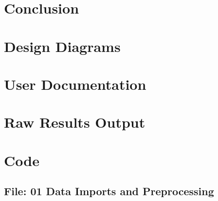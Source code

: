 \documentclass[12pt,a4paper]{report}
\begin{document}
\chapter{Conclusion}



\appendix


\chapter{Design Diagrams}

\chapter{User Documentation}

\chapter{Raw Results Output}


\chapter{Code}
\begin{landscape}
\begin{multicols}{2}
\section{File: 01 Data Imports and Preprocessing}

\end{multicols}
\end{landscape}
\end{document}
